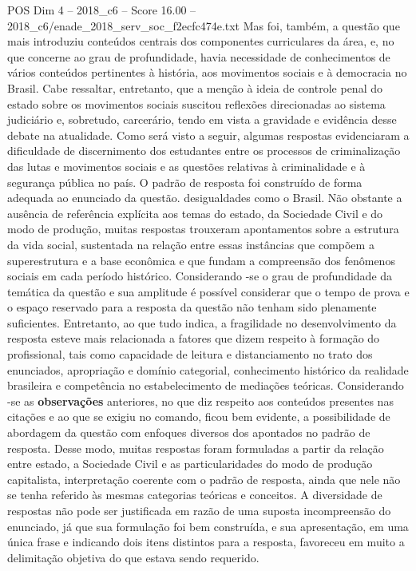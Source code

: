 \begin{textsample}{POS Dim 4 – 2018\_c6 – Score 16.00 – 2018\_c6/enade\_2018\_serv\_soc\_f2ecfc474e.txt}
Mas foi, também, a questão que mais introduziu conteúdos centrais dos componentes curriculares da área, e, no que concerne ao grau de profundidade, havia necessidade de conhecimentos de vários conteúdos pertinentes à história, aos movimentos sociais e à democracia no Brasil.
Cabe ressaltar, entretanto, que a menção à ideia de controle penal do estado sobre os movimentos sociais suscitou reflexões direcionadas ao sistema judiciário e, sobretudo, carcerário, tendo em vista a gravidade e evidência desse debate na atualidade.
Como será visto a seguir, algumas respostas evidenciaram a dificuldade de discernimento dos estudantes entre os processos de criminalização das lutas e movimentos sociais e as questões relativas à criminalidade e à segurança pública no país.
O padrão de resposta foi construído de forma adequada ao enunciado da questão. desigualdades como o Brasil.
Não obstante a ausência de referência explícita aos temas do estado, da Sociedade Civil e do modo de produção, muitas respostas trouxeram apontamentos sobre a estrutura da vida social, sustentada na relação entre essas instâncias que compõem a superestrutura e a base econômica e que fundam a compreensão dos fenômenos sociais em cada período histórico.
Considerando -se o grau de profundidade da temática da questão e sua amplitude é possível considerar que o tempo de prova e o espaço reservado para a resposta da questão não tenham sido plenamente suficientes.
Entretanto, ao que tudo indica, a fragilidade no desenvolvimento da resposta esteve mais relacionada a fatores que dizem respeito à formação do profissional, tais como capacidade de leitura e distanciamento no trato dos enunciados, apropriação e domínio categorial, conhecimento histórico da realidade brasileira e competência no estabelecimento de mediações teóricas.
Considerando -se as \textbf{observações} anteriores, no que diz respeito aos conteúdos presentes nas citações e ao que se exigiu no comando, ficou bem evidente, a possibilidade de abordagem da questão com enfoques diversos dos apontados no padrão de resposta.
Desse modo, muitas respostas foram formuladas a partir da relação entre estado, a Sociedade Civil e as particularidades do modo de produção capitalista, interpretação coerente com o padrão de resposta, ainda que nele não se tenha referido às mesmas categorias teóricas e conceitos.
A diversidade de respostas não pode ser justificada em razão de uma suposta incompreensão do enunciado, já que sua formulação foi bem construída, e sua apresentação, em uma única frase e indicando dois itens distintos para a resposta, favoreceu em muito a delimitação objetiva do que estava sendo requerido.

\end{textsample}

